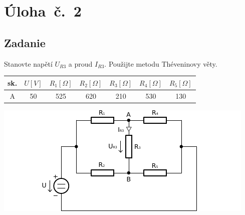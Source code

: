 \section{Úloha~č.~2}
\subsection{Zadanie}
Stanovte napětí $U_{R3}$ a proud $I_{R3}$. Použijte metodu Théveninovy věty.
\begin{table}[H]
\begin{center}
  \begin{tabular}{|c|c|c|c|c|c|c|}
    \hline
    sk. &  $U [V]$ &  $R_{1} [\Omega]$ &  $R_{2} [\Omega]$ &  $R_{3} [\Omega]$ &  $R_{4} [\Omega]$ &  $R_{5} [\Omega]$ \\ \hline
    A & 50 & 525 & 620 & 210 & 530 & 130 \\ \hline
  \end{tabular}
\end{center}
\end{table}
\begin{center}
  \includegraphics[width=0.8\columnwidth,keepaspectratio]{res/u2o1}
\end{center}
